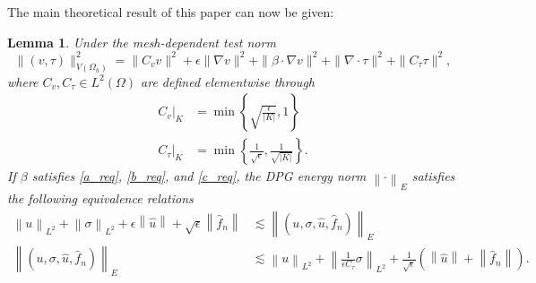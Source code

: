 \documentclass[11pt,onecolumn]{scrartcl}
\newcommand{\nor}[1]{\left\| #1 \right\|}
\newcommand{\Oh}{\Omega_h}
\newcommand{\grad}{\nabla}
\renewcommand{\div}{\grad \cdot}
\newtheorem{lemma}{Lemma}
\begin{document}
The main theoretical result of this paper can now be given:
\begin{lemma}
Under the mesh-dependent test norm
\[
\|\left(v,\tau\right)\|_{V(\Oh)}^2 = \|C_vv\|^2 + \epsilon \|\grad v\|^2 + \|\beta \cdot \grad v\|^2 + \| \div \tau\|^2 + \|C_\tau\tau\|^2,
\]
where $C_v, C_{\tau}\in L^2(\Omega)$ are defined elementwise through
\begin{align*}
\left.C_v\right |_K &= \min\left\{\sqrt{\frac{\epsilon}{|K|}},1\right\}\\
\left.C_{\tau}\right |_K &= \min\left\{\frac{1}{\sqrt{\epsilon}},\frac{1}{\sqrt{|K|}}\right\}.
\end{align*}
If $\beta$ satisfies \eqref{a_req}, \eqref{b_req}, and \eqref{c_req}, the DPG energy norm $\nor{\cdot}_E$ satisfies the following equivalence relations
\begin{align*}
\nor{u}_{L^2} + \nor{\sigma}_{L^2} + \epsilon\nor{\widehat{u}} + \sqrt{\epsilon}\nor{\widehat{f}_n} 
&\lesssim \nor{\left(u,\sigma, \widehat{u},\widehat{f}_n\right)}_E \\ 
\nor{\left(u,\sigma, \widehat{u},\widehat{f}_n\right)}_E &\lesssim \nor{u}_{L^2} + \nor{\frac{1}{\epsilon C_\tau} \sigma}_{L^2} + \frac{1}{\sqrt{\epsilon}} \left(\nor{\widehat{u}} + \nor{\widehat{f}_n}\right).
\end{align*}
\end{lemma}
\end{document}
